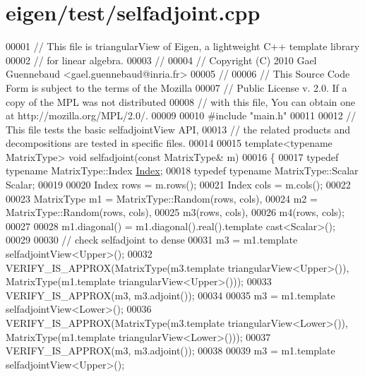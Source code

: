 \hypertarget{eigen_2test_2selfadjoint_8cpp_source}{}\section{eigen/test/selfadjoint.cpp}
\label{eigen_2test_2selfadjoint_8cpp_source}

\begin{DoxyCode}
00001 \textcolor{comment}{// This file is triangularView of Eigen, a lightweight C++ template library}
00002 \textcolor{comment}{// for linear algebra.}
00003 \textcolor{comment}{//}
00004 \textcolor{comment}{// Copyright (C) 2010 Gael Guennebaud <gael.guennebaud@inria.fr>}
00005 \textcolor{comment}{//}
00006 \textcolor{comment}{// This Source Code Form is subject to the terms of the Mozilla}
00007 \textcolor{comment}{// Public License v. 2.0. If a copy of the MPL was not distributed}
00008 \textcolor{comment}{// with this file, You can obtain one at http://mozilla.org/MPL/2.0/.}
00009 
00010 \textcolor{preprocessor}{#include "main.h"}
00011 
00012 \textcolor{comment}{// This file tests the basic selfadjointView API,}
00013 \textcolor{comment}{// the related products and decompositions are tested in specific files.}
00014 
00015 \textcolor{keyword}{template}<\textcolor{keyword}{typename} MatrixType> \textcolor{keywordtype}{void} selfadjoint(\textcolor{keyword}{const} MatrixType& m)
00016 \{
00017   \textcolor{keyword}{typedef} \textcolor{keyword}{typename} MatrixType::Index \hyperlink{namespace_eigen_a62e77e0933482dafde8fe197d9a2cfde}{Index};
00018   \textcolor{keyword}{typedef} \textcolor{keyword}{typename} MatrixType::Scalar Scalar;
00019 
00020   Index rows = m.rows();
00021   Index cols = m.cols();
00022 
00023   MatrixType m1 = MatrixType::Random(rows, cols),
00024              m2 = MatrixType::Random(rows, cols),
00025              m3(rows, cols),
00026              m4(rows, cols);
00027 
00028   m1.diagonal() = m1.diagonal().real().template cast<Scalar>();
00029 
00030   \textcolor{comment}{// check selfadjoint to dense}
00031   m3 = m1.template selfadjointView<Upper>();
00032   VERIFY\_IS\_APPROX(MatrixType(m3.template triangularView<Upper>()), MatrixType(m1.template 
      triangularView<Upper>()));
00033   VERIFY\_IS\_APPROX(m3, m3.adjoint());
00034 
00035   m3 = m1.template selfadjointView<Lower>();
00036   VERIFY\_IS\_APPROX(MatrixType(m3.template triangularView<Lower>()), MatrixType(m1.template 
      triangularView<Lower>()));
00037   VERIFY\_IS\_APPROX(m3, m3.adjoint());
00038 
00039   m3 = m1.template selfadjointView<Upper>();

\end{DoxyCode}
